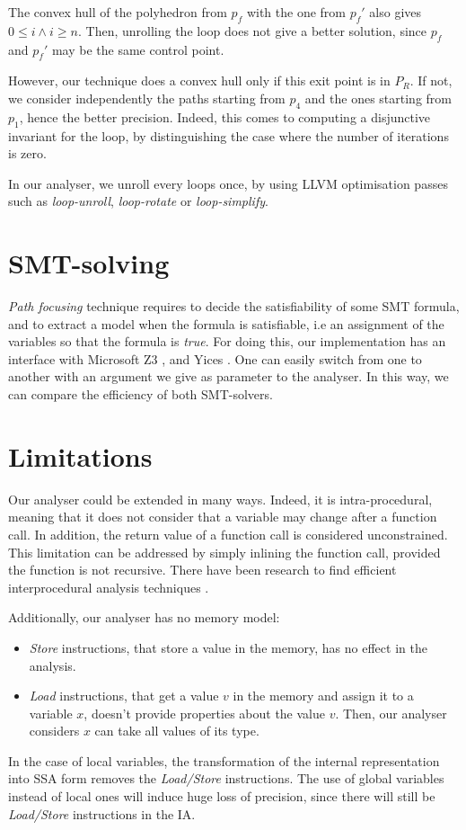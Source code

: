 \documentclass[a4paper,english,titlepage,11pt]{report}
\begin{document}
The convex hull of the polyhedron from $p_f$ with the one from $p_f'$ also gives
$0 \leq i \wedge i \geq n$. Then, unrolling the loop does not give a better
solution, since
$p_f$ and $p_f'$ may be the same control point.

However, our technique does a convex hull only if this exit point is in $P_R$. 
If not, we consider independently the paths starting from $p_4$ and the ones
starting from $p_1$, hence the better precision. Indeed, this comes to computing
a disjunctive invariant for the loop, by distinguishing the case where the
number of iterations is zero. 

In our analyser, we unroll every loops once, by using LLVM optimisation
passes such as \emph{loop-unroll}, \emph{loop-rotate} or \emph{loop-simplify}.


	\section{SMT-solving}

	\emph{Path focusing} technique requires to decide the satisfiability of some
	SMT formula, and to extract a model when the formula is satisfiable, i.e an
	assignment of the variables so that the formula is \emph{true}. For doing
	this, our implementation has an interface with Microsoft Z3 \cite{MouraB08},
	and Yices \cite{DutertreM06}. One can easily switch from one to another with
	an argument we give as parameter to the analyser. In this way, we can
	compare the efficiency of both SMT-solvers.

	\section{Limitations}

	Our analyser could be extended in many ways. Indeed, it is intra-procedural,
	meaning that it does not consider that a variable may change after a
	function call. In addition, the return value of a function call is
	considered unconstrained. This limitation can be addressed by simply
	inlining the function call, provided the function is not recursive.
	There have been research to find efficient interprocedural analysis
	techniques \cite{Bourdoncle90,Bou92}.

	Additionally, our analyser has no memory model:
\begin{itemize}
\item \emph{Store} instructions, that store a value in the memory, has no effect
in the analysis.
\item \emph{Load} instructions, that get a value $v$ in the memory and assign it
to a variable $x$, doesn't provide properties about the value $v$. Then, our
analyser considers $x$ can take all values of its type.
\end{itemize}
In the case of local variables, the transformation of the internal
representation into SSA form removes the \emph{Load/Store} instructions.
The use of global variables instead of local ones will induce huge
loss of precision, since there will still be \emph{Load/Store} instructions in
the IA.
\end{document}
